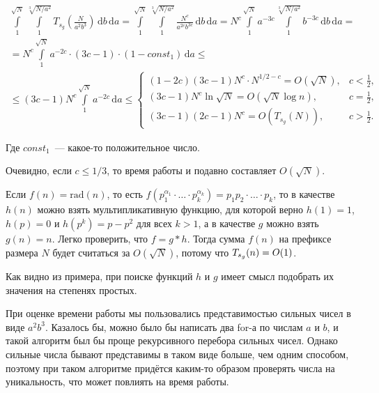 \begin{multline*}
    \int\limits_{1}^{\sqrt{N}}\int\limits_{1}^{\sqrt[3]{N/a^2}}T_{s_g}\left(\frac{N}{a^2b^3}\right)\,\mathrm{d}b\,\mathrm{d}a = \int\limits_{1}^{\sqrt{N}}\int\limits_{1}^{\sqrt[3]{N/a^2}}\frac{N^c}{a^{2c}b^{3c}}\,\mathrm{d}b\,\mathrm{d}a = N^c \int\limits_{1}^{\sqrt{N}} a^{-3c} \int\limits_{1}^{\sqrt[3]{N / a^2}} b^{-3c} \,\mathrm{d}b\,\mathrm{d}a = \\
    =  N^c \int\limits_{1}^{\sqrt{N}} a^{-2c} \cdot (3c - 1) \cdot (1 - const_1) \,\mathrm{d}a \le \\
    \le (3c - 1)N^c\int\limits_{1}^{\sqrt{N}} a^{-2c} \, \mathrm{d}a\leq\begin{cases}
(1 - 2c)(3c - 1)N^c\cdot N^{1/2 - c} = O(\sqrt{N}), & c < \frac{1}{2}, \\
(3c - 1)N^c\ln\sqrt{N} = O(\sqrt{N}\log{n}), & c = \frac{1}{2}, \\
(3c - 1)(2c - 1)N^c = O(T_{s_g}(N)), & c > \frac{1}{2}.
\end{cases}
\end{multline*}

Где $const_1$~--- какое-то положительное число.

Очевидно, если $c \le 1/3$, то время работы и подавно составляет $O(\sqrt{N})$.

\begin{example}
    Если $f(n)=\mathrm{rad}(n)$, то есть $f(p_1^{\alpha_1} \cdot \ldots \cdot p_k^{\alpha_k}) = p_1p_2 \cdot \ldots \cdot p_k$, то в качестве $h(n)$ можно взять мультипликативную функцию, для которой верно $h(1) = 1$, $h(p) = 0$ и $h(p^k) = p - p^2$ для всех $k > 1$, а в качестве $g$ можно взять $g(n) = n$. Легко проверить, что $f = g * h$. Тогда сумма $f(n)$ на префиксе размера $N$ будет считаться за $O(\sqrt{N})$, потому что $T_{s_g}(n) = O(1)$.
\end{example}

\begin{observation}
    Как видно из примера, при поиске функций $h$ и $g$ имеет смысл подобрать их значения на степенях простых.
\end{observation}

\begin{observation}
    При оценке времени работы мы пользовались представимостью сильных чисел в виде $a^2b^3$. Казалось бы, можно было бы написать два for-а по числам $a$ и $b$, и такой алгоритм был бы проще рекурсивного перебора сильных чисел. Однако сильные числа бывают представимы в таком виде больше, чем одним способом, поэтому при таком алгоритме придётся каким-то образом проверять числа на уникальность, что может повлиять на время работы.
\end{observation}

